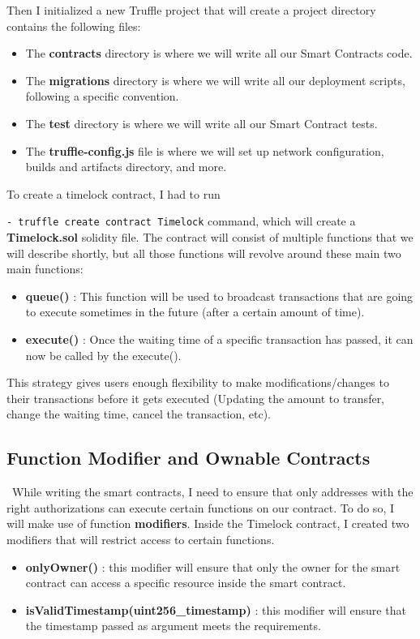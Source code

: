 \documentclass[10pt,twocolumn]{article}
\begin{document}
Then I initialized a new Truffle project that will create a project directory contains the following files:
\begin{itemize}
    \item The \textbf{contracts} directory is where we will write all our Smart Contracts code.
    \item The \textbf{migrations} directory is where we will write all our deployment scripts, following a specific convention.
    \item The \textbf{test} directory is where we will write all our Smart Contract tests.
    \item The \textbf{truffle-config.js} file is where we will set up network configuration, builds and artifacts directory, and more.
\end{itemize}

To create a timelock contract, I had to run

\texttt{- truffle create contract Timelock} command, which will create a \textbf{Timelock.sol} solidity file. The contract will consist of multiple functions that we will describe shortly, but all those functions will revolve around these main two main functions:

\begin{itemize}
    \item  \textbf{queue()} : This function will be used to broadcast transactions that are going to execute sometimes in the future (after a certain amount of time).
    \item  \textbf{execute()} : Once the waiting time of a specific transaction has passed, it can now be called by the execute().
\end{itemize}

This strategy gives users enough flexibility to make modifications/changes to their transactions before it gets executed (Updating the amount to transfer, change the waiting time, cancel the transaction, etc).

\subsection{Function Modifier and Ownable Contracts}\
While writing the smart contracts, I need to ensure that only addresses with the right authorizations can execute certain functions on our contract. To do so, I will make use of function \textbf{modifiers}.
Inside the Timelock contract, I created two modifiers that will restrict access to certain functions.
\begin{itemize}
    \item \textbf{onlyOwner()} : this modifier will ensure that only the owner for the smart contract can access a specific resource inside the smart contract.
    \item \textbf{isValidTimestamp(uint256\_timestamp)} : this modifier will ensure that the timestamp passed as argument meets the requirements.
\end{itemize}
\end{document}
